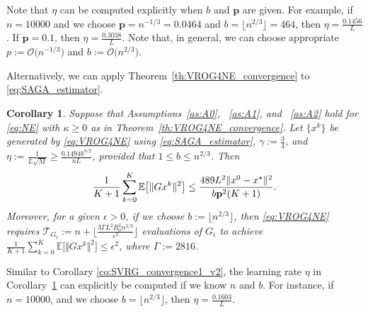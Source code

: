 \documentclass{article}
\newcommand{\sets}[1]{\{#1\}}
\newcommand{\norms}[1]{\Vert#1\Vert}
\newcommand{\Expk}[1]{\mathbb{E}\big[#1\big]}
\newcommand{\Tc}{\mathcal{T}}
\newcommand{\BigOs}[1]{\mathcal{O}\big(#1\big)}
\newcommand{\mbf}[1]{\mathbf{#1}}
\theoremstyle{plain}
\newtheorem{corollary}[theorem]{Corollary}
\theoremstyle{definition}
\theoremstyle{remark}
\begin{document}
Note that  $\eta$ can be computed explicitly when $b$ and $\mbf{p}$ are given.
For example, if $n = 10000$ and we choose $\mbf{p} = n^{-1/3} = 0.0464$ and $b = \lfloor n^{2/3}\rfloor = 464$, then $\eta = \frac{0.1456}{L}$.
If $\mbf{p} = 0.1$, then $\eta = \frac{0.3038}{L}$.
Note that, in general,  we can choose appropriate $p := \BigOs{n^{-1/3}}$ and $b := \BigOs{n^{2/3}}$.

Alternatively, we can apply Theorem~\ref{th:VROG4NE_convergence} to \eqref{eq:SAGA_estimator}. 

\begin{corollary}\label{co:SVRG_convergence1_v3}
Suppose that Assumptions~\ref{as:A0}, ~\ref{as:A1}, and ~\ref{as:A2} hold for \eqref{eq:NE} with $\kappa \geq 0$ as in Theorem~\ref{th:VROG4NE_convergence}.
Let $\sets{x^k}$ be generated by \eqref{eq:VROG4NE} using  \eqref{eq:SAGA_estimator}, $\gamma := \frac{3}{4}$, and $\eta := \frac{1}{L\sqrt{M}} \geq \frac{0.1494 b^{3/2}}{nL}$, provided that $1\leq b \leq n^{2/3}$.
Then %
\vspace{-0.75ex}
\begin{equation}\label{eq:SFP_convergence_bound_v3}
\frac{1}{K+1}\sum_{k=0}^{K} \Expk{ \norms{Gx^k}^2 }   \leq     \frac{489 L^2 \norms{x^0 - x^{\star}}^2 }{ b\mbf{p}^2 (K + 1)}.
\vspace{-0.5ex}
\end{equation}
Moreover, for a given $\epsilon > 0$, if we choose $b := \lfloor n^{2/3} \rfloor$, then  \eqref{eq:VROG4NE} requires $\Tc_{G_i} := n + \big\lfloor \frac{ 3\Gamma L^2R_0^2 n^{2/3}}{ \varepsilon^2} \big\rfloor$ evaluations of $G_i$ to achieve $\frac{1}{K+1}\sum_{k=0}^{K} \Expk{ \norms{Gx^k }^2 } \leq \epsilon^2$, where $\Gamma := 2816$.
\end{corollary}

Similar to Corollary \ref{co:SVRG_convergence1_v2}, the learning rate $\eta$ in Corollary~\ref{co:SVRG_convergence1_v3} can explicitly be computed if we know $n$ and $b$.
For instance, if $n = 10000$, and we choose $b = \lfloor n^{2/3}\rfloor$, then $\eta = \frac{0.1603}{L}$.
\end{document}

